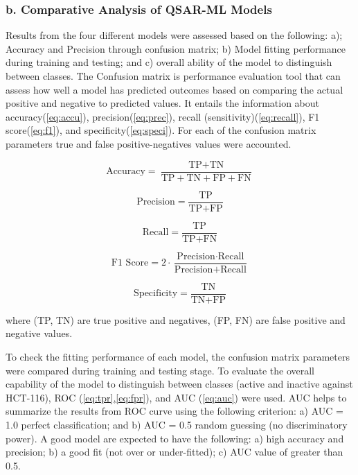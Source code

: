 
\subsubsection*{b. Comparative Analysis of QSAR-ML Models}
Results from the four different models were assessed based on the following: a); Accuracy and Precision through confusion matrix; b) Model fitting performance during training and testing; and c) overall ability of the model to distinguish between classes. The Confusion matrix is performance evaluation tool that can assess how well a model has predicted outcomes based on comparing the actual positive and negative to predicted values. It entails the information about accuracy(\ref{eq:accu}), precision(\ref{eq:prec}), recall (sensitivity)(\ref{eq:recall}), F1 score(\ref{eq:f1}), and specificity(\ref{eq:speci}). For each of the confusion matrix parameters true and false positive-negatives values were accounted.    

\begin{equation}
    \text{Accuracy} = \frac{\text{TP} + \text{TN}}{\text{TP} + \text{TN} + \text{FP} + \text{FN}}
    \label{eq:accu}
\end{equation}

\begin{equation}
    \text{Precision} = \frac{\text{TP}}{\text{TP} + \text{FP}}
    \label{eq:prec}
\end{equation}

\begin{equation}
   \text{Recall} = \frac{\text{TP}}{\text{TP} + \text{FN}}
   \label{eq:recall}
\end{equation}

\begin{equation}
     \text{F1 Score} = 2 \cdot \frac{\text{Precision} \cdot \text{Recall}}{\text{Precision} + \text{Recall}}
     \label{eq:f1}
\end{equation}

\begin{equation}
    \text{Specificity} = \frac{\text{TN}}{\text{TN} + \text{FP}}
    \label{eq:speci}
\end{equation}

where (TP, TN) are true positive and negatives, (FP, FN) are false positive and negative values.

To check the fitting performance of each model, the confusion matrix parameters were compared during training and testing stage. To evaluate the overall capability of the model to distinguish between classes (active and inactive against HCT-116), ROC (\ref{eq:tpr},\ref{eq:fpr}), and AUC (\ref{eq:auc}) were used. AUC helps to summarize the results from ROC curve using the following criterion: a) AUC = 1.0 perfect classification; and b) AUC = 0.5 random guessing (no discriminatory power). A good model are expected to have the following: a) high accuracy and precision; b) a good fit (not over or under-fitted); c) AUC value of greater than 0.5. 

